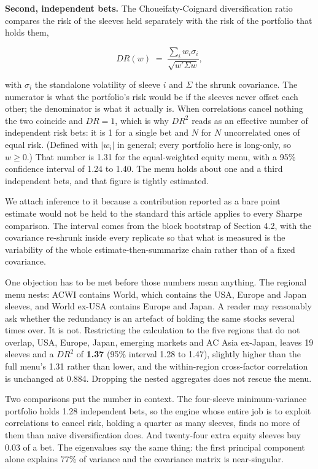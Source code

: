\documentclass[12pt,letterpaper]{article}
\newcommand{\head}[1]{\noindent\textbf{#1}\hspace{0.5em}\ignorespaces}
\begin{document}
\head{Second, independent bets.} The Choueifaty-Coignard diversification ratio compares the
risk of the sleeves held separately with the risk of the portfolio that holds them,

\begin{equation}
DR(w) \;=\; \frac{\sum_i w_i \sigma_i}{\sqrt{w' \Sigma w}},
\end{equation}

\noindent with $\sigma_i$ the standalone volatility of sleeve $i$ and $\Sigma$ the shrunk
covariance. The numerator is what the portfolio's risk would be if the sleeves never offset each
other; the denominator is what it actually is. When correlations cancel nothing the two coincide
and $DR = 1$, which is why $DR^{2}$ reads as an effective number of independent risk bets: it is
1 for a single bet and $N$ for $N$ uncorrelated ones of equal risk. (Defined with $|w_i|$ in
general; every portfolio here is long-only, so $w \ge 0$.) That number is 1.31 for the
equal-weighted equity menu, with a 95\% confidence interval of 1.24 to 1.40. The menu
holds about one and a third independent bets, and that figure is tightly estimated.

We attach inference to it because a contribution reported as a bare point estimate would not be
held to the standard this article applies to every Sharpe comparison. The interval comes from
the block bootstrap of Section 4.2, with the covariance re-shrunk inside every replicate so
that what is measured is the variability of the whole estimate-then-summarize chain rather than
of a fixed covariance.

One objection has to be met before those numbers mean anything. The regional menu nests:
ACWI contains World, which contains the USA, Europe and Japan sleeves, and World ex-USA
contains Europe and Japan. A reader may reasonably ask whether the redundancy is an artefact of
holding the same stocks several times over. It is not. Restricting the calculation to the five
regions that do not overlap, USA, Europe, Japan, emerging markets and AC Asia ex-Japan, leaves
19 sleeves and a $DR^{2}$ of \textbf{1.37} (95\% interval 1.28 to 1.47), slightly higher than
the full menu's 1.31 rather than lower, and the within-region cross-factor correlation is
unchanged at 0.884. Dropping the nested aggregates does not rescue the menu.

Two comparisons put the number in context. The four-sleeve minimum-variance portfolio holds
1.28 independent bets, so the engine whose entire job is to exploit correlations to
cancel risk, holding a quarter as many sleeves, finds no more of them than naive diversification
does. And twenty-four extra equity sleeves buy 0.03 of a bet. The eigenvalues say the same thing: the first principal component alone explains
77\% of variance and the covariance matrix is near-singular.
\end{document}
